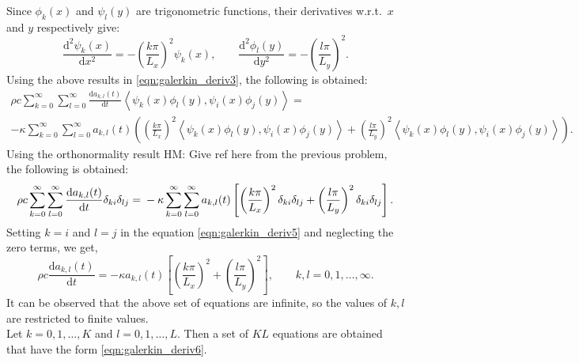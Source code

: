 \documentclass[12pt]{article}
\newcommand{\HM}[1]{{\color{green} HM: #1}}
\newcommand{\der}[2]{\frac{\mathrm{d} #1}{\mathrm{d} #2}}
\newcommand{\dotprod}[2]{\left\langle #1, #2 \right\rangle}
\begin{document}
Since $\phi_k(x)$ and $\psi_l(y)$ are trigonometric functions, their derivatives w.r.t.\ $x$ and $y$ respectively give:
\begin{equation}
\der{^2 \psi_k(x)}{x^2} = -\left(\frac{k\pi}{L_x}\right)^2 \psi_k(x), \qquad \der{^2 \phi_l(y)}{y^2} = -\left(\frac{l\pi}{L_y}\right)^2.
\end{equation}
Using the above results in \eqref{eqn:galerkin_deriv3}, the following is obtained:
\begin{multline}
\rho c \sum_{k=0}^\infty\sum_{l=0}^\infty \der{a_{k,l}(t)}{t} \dotprod{\psi_k(x)\phi_l(y)}{\psi_i(x)\phi_j(y)} = \\ -\kappa \sum_{k=0}^\infty\sum_{l=0}^\infty a_{k,l}(t) \left(\left(\frac{k\pi}{L_x}\right)^2\dotprod{\psi_k(x)\phi_l(y)}{\psi_i(x)\phi_j(y)} + \left(\frac{l\pi}{L_y}\right)^2\dotprod{\psi_k(x)\phi_l(y)}{\psi_i(x)\phi_j(y)}\right).
\label{eqn:galerkin_deriv4}
\end{multline}
Using the orthonormality result \HM{Give ref here} from the previous problem, the following is obtained:
\begin{equation}
\rho c \sum_{k=0}^\infty\sum_{l=0}^\infty \der{a_{k,l}(t)}{t} \delta_{ki}\delta_{lj} = \\ -\kappa \sum_{k=0}^\infty\sum_{l=0}^\infty a_{k,l}(t) \left[\left(\frac{k\pi}{L_x}\right)^2\delta_{ki}\delta_{lj} + \left(\frac{l\pi}{L_y}\right)^2\delta_{ki}\delta_{lj}\right].
\label{eqn:galerkin_deriv5}
\end{equation}
Setting $k = i$ and $l = j$ in the equation \eqref{eqn:galerkin_deriv5} and neglecting the zero terms, we get,
\begin{equation}
\rho c \der{a_{k,l}(t)}{t}  = -\kappa a_{k,l}(t)\left[\left(\frac{k\pi}{L_x}\right)^2 + \left(\frac{l\pi}{L_y}\right)^2\right], \qquad k,l = 0,1,\ldots,\infty.
\label{eqn:galerkin_deriv6}
\end{equation}
It can be observed that the above set of equations are infinite, so the values of $k,l$ are restricted to finite values. \\
Let $k = 0,1,\ldots,K$ and $l = 0,1,\ldots,L$. Then a set of $KL$ equations are obtained that have the form \eqref{eqn:galerkin_deriv6}.
 

\pagebreak
\appendix
\end{document}

